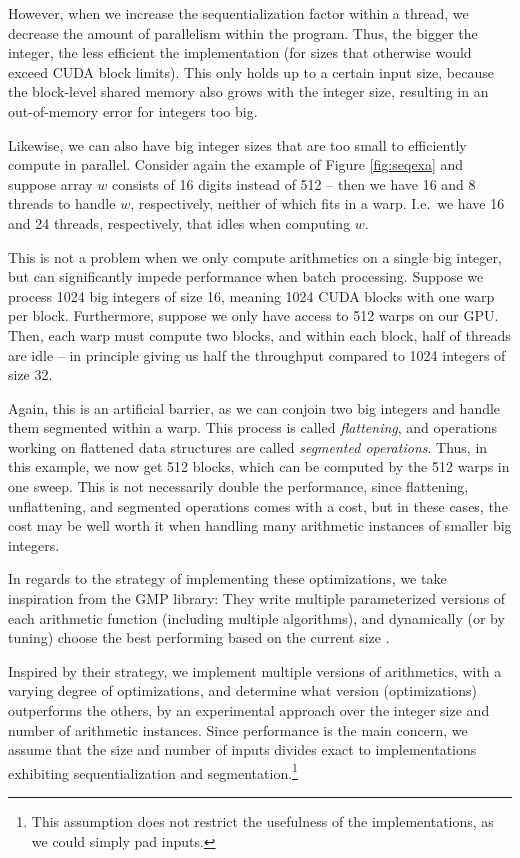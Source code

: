 However, when we increase the sequentialization factor within a thread, we
decrease the amount of parallelism within the program. Thus, the bigger the
integer, the less efficient the implementation (for sizes that otherwise would
exceed CUDA block limits). This only holds up to a certain input size, because
the block-level shared memory also grows with the integer size, resulting in an
out-of-memory error for integers too big.

Likewise, we can also have big integer sizes that are too small to efficiently
compute in parallel. Consider again the example of Figure \ref{fig:seqexa} and
suppose array $w$ consists of 16 digits instead of 512 -- then we have 16 and 8
threads to handle $w$, respectively, neither of which fits in a warp. I.e.\ we
have 16 and 24 threads, respectively, that idles when computing $w$.

This is not a problem when we only compute arithmetics on a single big integer,
but can significantly impede performance when batch processing. Suppose we
process 1024 big integers of size 16, meaning 1024 CUDA blocks with one warp per
block. Furthermore, suppose we only have access to 512 warps on our GPU. Then,
each warp must compute two blocks, and within each block, half of threads are
idle -- in principle giving us half the throughput compared to 1024 integers of
size 32.

Again, this is an artificial barrier, as we can conjoin two big integers and
handle them segmented within a warp. This process is called \textit{flattening},
and operations working on flattened data structures are called \textit{segmented
  operations}. Thus, in this example, we now get 512 blocks, which can be
computed by the 512 warps in one sweep. This is not necessarily double the
performance, since flattening, unflattening, and segmented operations comes with
a cost, but in these cases, the cost may be well worth it when handling many
arithmetic instances of smaller big integers.


In regards to the strategy of implementing these optimizations, we take
inspiration from the GMP library: They write multiple parameterized versions of
each arithmetic function (including multiple algorithms), and dynamically (or by
tuning) choose the best performing based on the current size \cite{GMP}.

Inspired by their strategy, we implement multiple versions of arithmetics, with
a varying degree of optimizations, and determine what version (optimizations)
outperforms the others, by an experimental approach over the integer size and
number of arithmetic instances. Since performance is the main concern, we assume
that the size and number of inputs divides exact to implementations exhibiting
sequentialization and segmentation.\footnote{This assumption does not restrict
  the usefulness of the implementations, as we could simply pad inputs.}



